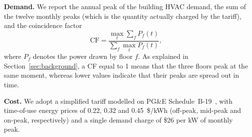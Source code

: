 \documentclass[conference]{IEEEtran}
\begin{document}
\textbf{Demand.} We report the annual peak of the building HVAC demand, the sum
of the twelve monthly peaks (which is the quantity actually charged by the
tariff), and the coincidence factor
\begin{equation}
\mathrm{CF} = \frac{\max_t \sum_f P_f(t)}{\sum_f \max_t P_f(t)},
\end{equation}
where $P_f$ denotes the power drawn by floor $f$. As explained in
Section~\ref{sec:background}, a CF equal to 1 means that the three floors peak
at the same moment, whereas lower values indicate that their peaks are spread
out in time.

\textbf{Cost.} We adopt a simplified tariff modelled on PG\&E
Schedule~B-19~\cite{pge_b19}, with time-of-use energy prices of 0.22, 0.32
and 0.45~\$/kWh (off-peak, mid-peak and on-peak, respectively) and a single
demand charge of \$26 per kW of monthly peak.
\end{document}
